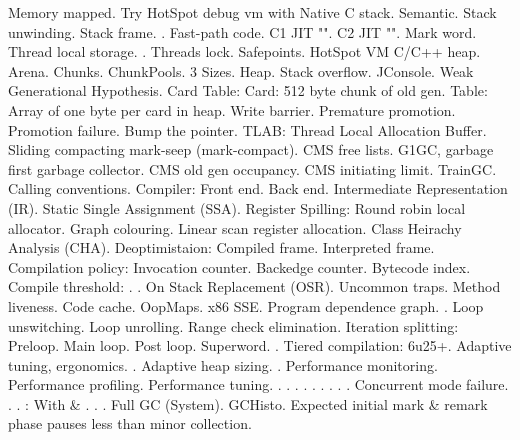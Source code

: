 \I Memory mapped.
\lskip
\I Try HotSpot debug vm with 
\I Native C stack.
\I Semantic.
\I Stack unwinding.
\I Stack frame.
\I {}.
\I Fast-path code.
\I C1 JIT "".
\I C2 JIT "".
\I Mark word.
\I Thread local storage.
\I {}.
\I Threads lock.
\I Safepoints.
\I HotSpot VM C/C++ heap.
\II Arena.
\II Chunks.
\II ChunkPools. 3 Sizes.
\I Heap.
\I {}
\I {}
\I {}
\I Stack overflow.
\I {}
\I JConsole.
\I Weak Generational Hypothesis.
\I Card Table:
\II Card: 512 byte chunk of old gen.
\II Table: Array of one byte per card in heap.
\I Write barrier.
\I Premature promotion.
\I Promotion failure.
\I Bump the pointer.
\I TLAB: Thread Local Allocation Buffer.
\I Sliding compacting mark-seep (mark-compact).
\I CMS free lists.
\I G1GC, garbage first garbage collector.
\I CMS old gen occupancy.
\I CMS initiating limit.
\I TrainGC.
\I Calling conventions.
\I Compiler:
\II Front end.
\II Back end.
\II Intermediate Representation (IR).
\II Static Single Assignment (SSA).
\I Register Spilling:
\II Round robin local allocator.
\II Graph colouring.
\II Linear scan register allocation.
\I Class Heirachy Analysis (CHA).
\I Deoptimistaion:
\II Compiled frame.
\II Interpreted frame.
\I Compilation policy:
\II Invocation counter.
\II Backedge counter.
\I Bytecode index.
\I Compile threshold:
\II {}.
\II {}.
\I On Stack Replacement (OSR).
\I Uncommon traps.
\I Method liveness.
\I Code cache.
\I OopMaps.
\I x86 SSE.
\I Program dependence graph.
\I {}.
\I Loop unswitching.
\I Loop unrolling.
\I Range check elimination.
\I Iteration splitting:
\II Preloop.
\II Main loop.
\II Post loop.
\I Superword.
\I {}.
\I Tiered compilation:
\II {} 6u25+.
\I Adaptive tuning, ergonomics.
\I {}.
\I Adaptive heap sizing.
\I {}.
\I Performance monitoring.
\I Performance profiling.
\I Performance tuning.
\I {}.
\I {}.
\I {}.
\I {}.
\I {}.
\I {}.
\I {}.
\I {}.
\I {}.
\I Concurrent mode failure.
\I {}.
\I {}.
\I {}:
\II With  \& .
\I {}.
\I {}.
\I Full GC (System).
\I GCHisto.
\I Expected initial mark \& remark phase pauses less than minor collection.
